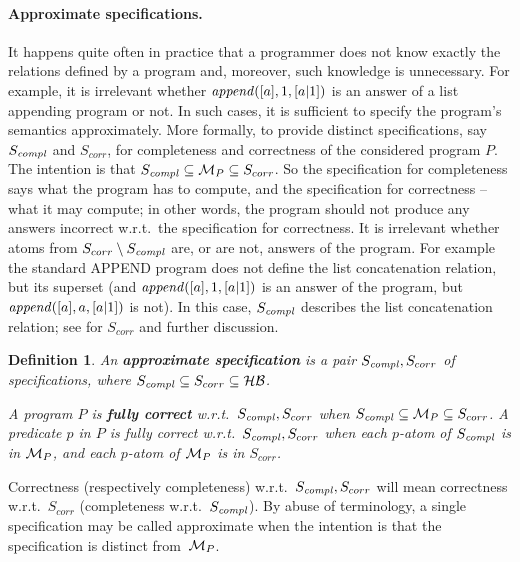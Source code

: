 \documentclass{tlp}
\newtheorem{definition}[theorem]{Definition}
\newcommand*{\HB}{{\ensuremath{\cal{H B}}}\xspace}
\newcommand*{\M}{{\ensuremath{\cal M}}\xspace}
\begin{document}


\paragraph{Approximate specifications.}
It happens quite often in practice that a programmer
does not know exactly the relations defined by a program
and, moreover, such knowledge is unnecessary.
For example, it is irrelevant whether 
$ {\it append}([a], 1, [a|1])$ is an answer of a list appending program or not.
In such cases, it is
 sufficient to specify the program's semantics approximately.
More formally, to provide distinct specifications, say
$S_{\it c o m p l}$ and $S_{corr}$, for completeness and correctness
of the considered program $P$.
The intention is that  $S_{\it c o m p l}\subseteq \M_P\subseteq S_{corr}$.
So the specification for completeness says what the program has to compute,
and the specification for correctness -- what it may compute;
in other words, the program should not produce any answers
incorrect w.r.t.\ the specification for correctness. 
It is irrelevant whether atoms from 
$S_{corr}\setminus S_{\it c o m p l}$ are, or are not, answers of the program.
For example the standard \mbox{APPEND} program does not define the list
concatenation relation, but its superset
(and $ {\it append}([a], 1, [a|1])$ is an answer of the program,
but $ {\it append}([a], a, [a|1])$ is not).
In this case, $S_{\it c o m p l}$ describes the list concatenation relation;
see \cite{drabent.tocl16}
for  $S_{corr}$ and further discussion.





\begin{definition}
An {\bf approximate specification} is 
a pair $S_{\it c o m p l}, S_{corr}$ of specifications, where
$S_{\it c o m p l}\subseteq S_{corr}\subseteq \HB$.

A program $P$ is {\bf fully correct} w.r.t.\  $S_{\it c o m p l}, S_{corr}$
when  $S_{\it c o m p l}\subseteq \M_P\subseteq S_{corr}$.
A predicate $p$ in $P$ is fully correct w.r.t.\ $S_{\it c o m p l}, S_{corr}$
when each $p$-atom of $S_{\it c o m p l}$ is in $\M_P$,
and each $p$-atom of $\M_P$ is in $S_{corr}$.
\end{definition}
Correctness (respectively completeness) w.r.t.\ 
$S_{\it c o m p l}, S_{corr}$ will mean
correctness w.r.t.\ $S_{corr}$ (completeness w.r.t.\ $S_{\it c o m p l}$). 
By abuse of terminology,
a single specification may be called
approximate when the intention is that the specification is
distinct from~$\M_P$.
\end{document}

